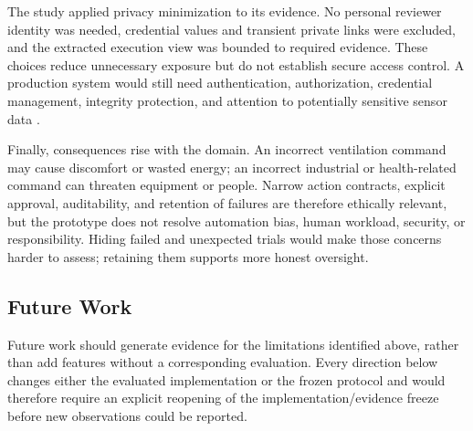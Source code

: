 The study applied privacy minimization to its evidence. No personal reviewer
identity was needed, credential values and transient private links were
excluded, and the extracted execution view was bounded to required evidence.
These choices reduce unnecessary exposure but do not establish secure access
control. A production system would still need authentication, authorization,
credential management, integrity protection, and attention to potentially
sensitive sensor data \cite{nist2023airmf}.

Finally, consequences rise with the domain. An incorrect ventilation command
may cause discomfort or wasted energy; an incorrect industrial or health-related
command can threaten equipment or people. Narrow action contracts, explicit
approval, auditability, and retention of failures are therefore ethically
relevant, but the prototype does not resolve automation bias, human workload,
security, or responsibility. Hiding failed and unexpected trials would make
those concerns harder to assess; retaining them supports more honest oversight.

\subsection{Future Work}\label{subsec:discussion-future}

Future work should generate evidence for the limitations identified above,
rather than add features without a corresponding evaluation. Every direction
below changes either the evaluated implementation or the frozen protocol and
would therefore require an explicit reopening of the implementation/evidence
freeze before new observations could be reported.

